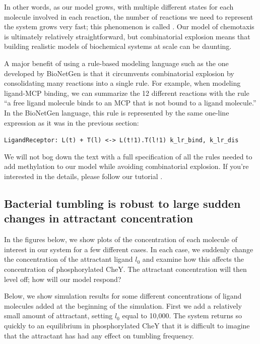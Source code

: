 In other words, as our model grows, with multiple different states for each molecule involved in each reaction, the number of reactions we need to represent the system grows very fast; this phenomenon is called . Our model of chemotaxis is ultimately relatively straightforward, but combinatorial explosion means that building realistic models of biochemical systems at scale can be daunting.

A major benefit of using a rule-based modeling language such as the one developed by BioNetGen is that it circumvents combinatorial explosion by consolidating many reactions into a single rule. For example, when modeling ligand-MCP binding, we can summarize the 12 different reactions with the rule ``a free ligand molecule binds to an MCP that is not bound to a ligand molecule.'' In the BioNetGen language, this rule is represented by the same one-line expression as it was in the previous section:

\texttt{LigandReceptor: L(t) + T(l) <-> L(t!1).T(l!1) k\_lr\_bind, k\_lr\_dis}

We will not bog down the text with a full specification of all the rules needed to add methylation to our model while avoiding combinatorial explosion. If you're interested in the details, please follow our tutorial .


\FloatBarrier
{}
\subsection{Bacterial tumbling is robust to large sudden changes in attractant concentration}

In the figures below, we show plots of the concentration of each molecule of interest in our system for a few different cases. In each case, we suddenly change the concentration of the attractant ligand $l_0$ and examine how this affects the concentration of phosphorylated CheY. The attractant concentration will then level off; how will our model respond?

Below, we show simulation results for some different concentrations of ligand molecules added at the beginning of the simulation. First we add a relatively small amount of attractant, setting $l_0$ equal to 10,000. The system returns so quickly to an equilibrium in phosphorylated CheY that it is difficult to imagine that the attractant has had any effect on tumbling frequency.

